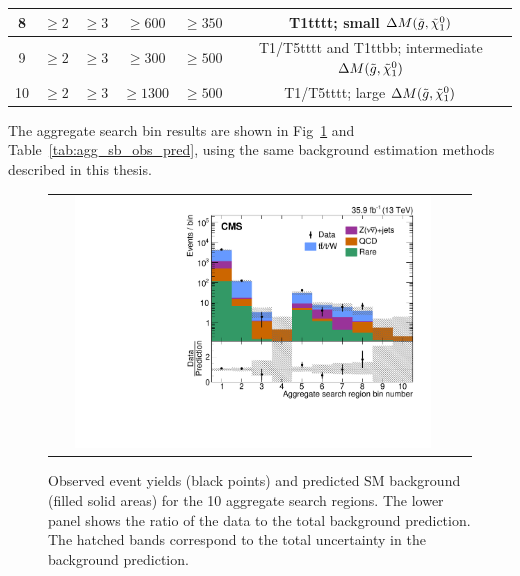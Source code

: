 \begin{table}[htb]
\begin{tabular}{cccccc}
\hline
8  & $\geq2$     & $\geq3$      & $\geq600$       & $\geq350$        & \specialcell{T1tttt; \\ small $\Delta M(\tilde{g},\tilde{\chi}^{0}_{1})$}    \\
\hline
9  & $\geq2$     & $\geq3$      & $\geq300$       & $\geq500$        & \specialcell{T1/T5tttt and T1ttbb; \\ intermediate $\Delta M(\tilde{g},\tilde{\chi}^{0}_{1})$}    \\
\hline
10 & $\geq2$     & $\geq3$      & $\geq1300$      & $\geq500$        & \specialcell{T1/T5tttt; \\ large $\Delta M(\tilde{g},\tilde{\chi}^{0}_{1})$}    \\
\hline
\end{tabular}
\end{table}

The aggregate search bin results are shown in Fig~\ref{fig:aggSearchBinResults} and Table~\ref{tab:agg_sb_obs_pred}, using the same background estimation methods described in this thesis.

\begin{figure}[htb]
 \begin{center}
  \begin{tabular}{cc}
   \includegraphics[angle=0,width=0.9\textwidth]{figures/appendix/aggregatedSearchBins.pdf}
  \end{tabular}
  \caption{
  Observed event yields (black points)
  and predicted SM background (filled solid areas)
  for the 10 aggregate search regions.
  The lower panel shows the ratio of the data to
  the total background prediction.
  The hatched bands correspond to the total uncertainty in the
  background prediction.
   }
  \label{fig:aggSearchBinResults}
 \end{center}
\end{figure}

